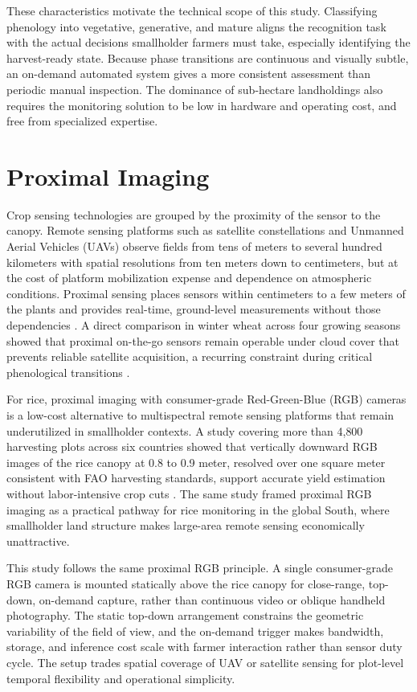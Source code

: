 These characteristics motivate the technical scope of this study. Classifying phenology into vegetative, generative, and mature aligns the recognition task with the actual decisions smallholder farmers must take, especially identifying the harvest-ready state. Because phase transitions are continuous and visually subtle, an on-demand automated system gives a more consistent assessment than periodic manual inspection. The dominance of sub-hectare landholdings also requires the monitoring solution to be low in hardware and operating cost, and free from specialized expertise.

\section{Proximal Imaging}
\label{sec:proximal_imaging}

Crop sensing technologies are grouped by the proximity of the sensor to the canopy. Remote sensing platforms such as satellite constellations and Unmanned Aerial Vehicles (UAVs) observe fields from tens of meters to several hundred kilometers with spatial resolutions from ten meters down to centimeters, but at the cost of platform mobilization expense and dependence on atmospheric conditions. Proximal sensing places sensors within centimeters to a few meters of the plants and provides real-time, ground-level measurements without those dependencies \cite{mezera2021proximalremote}. A direct comparison in winter wheat across four growing seasons showed that proximal on-the-go sensors remain operable under cloud cover that prevents reliable satellite acquisition, a recurring constraint during critical phenological transitions \cite{mezera2021proximalremote}.

For rice, proximal imaging with consumer-grade Red-Green-Blue (RGB) cameras is a low-cost alternative to multispectral remote sensing platforms that remain underutilized in smallholder contexts. A study covering more than 4{,}800 harvesting plots across six countries showed that vertically downward RGB images of the rice canopy at 0.8 to 0.9 meter, resolved over one square meter consistent with FAO harvesting standards, support accurate yield estimation without labor-intensive crop cuts \cite{tanaka2023rgbrice}. The same study framed proximal RGB imaging as a practical pathway for rice monitoring in the global South, where smallholder land structure makes large-area remote sensing economically unattractive.

This study follows the same proximal RGB principle. A single consumer-grade RGB camera is mounted statically above the rice canopy for close-range, top-down, on-demand capture, rather than continuous video or oblique handheld photography. The static top-down arrangement constrains the geometric variability of the field of view, and the on-demand trigger makes bandwidth, storage, and inference cost scale with farmer interaction rather than sensor duty cycle. The setup trades spatial coverage of UAV or satellite sensing for plot-level temporal flexibility and operational simplicity.

